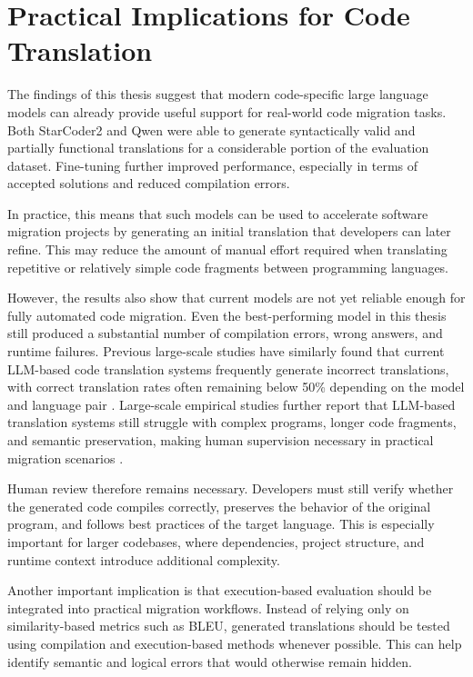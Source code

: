 \section{Practical Implications for Code Translation}

The findings of this thesis suggest that modern code-specific large language
models can already provide useful support for real-world code migration tasks.
Both StarCoder2 and Qwen were able to generate syntactically valid and
partially functional translations for a considerable portion of the evaluation
dataset. Fine-tuning further improved performance, especially in terms of
accepted solutions and reduced compilation errors.

In practice, this means that such models can be used to accelerate software
migration projects by generating an initial translation that developers can
later refine. This may reduce the amount of manual effort required when
translating repetitive or relatively simple code fragments between programming
languages.

However, the results also show that current models are not yet reliable enough for
fully automated code migration. Even the best-performing model in this thesis still
produced a substantial number of compilation errors, wrong answers, and runtime
failures. Previous large-scale studies have similarly found that current LLM-based
code translation systems frequently generate incorrect translations, with correct
translation rates often remaining below 50\% depending on the model and language
pair \cite{llm_limitations}. Large-scale empirical studies further report that
LLM-based translation systems still struggle with complex programs, longer code
fragments, and semantic preservation, making human supervision necessary in
practical migration scenarios \cite{correctness_llm}.

Human review therefore remains necessary. Developers must still verify whether
the generated code compiles correctly, preserves the behavior of the original
program, and follows best practices of the target language. This is especially
important for larger codebases, where dependencies, project structure, and
runtime context introduce additional complexity.

Another important implication is that execution-based evaluation should be
integrated into practical migration workflows. Instead of relying only on
similarity-based metrics such as BLEU, generated translations should be tested
using compilation and execution-based methods whenever possible. This can help
identify semantic and logical errors that would otherwise remain hidden.

